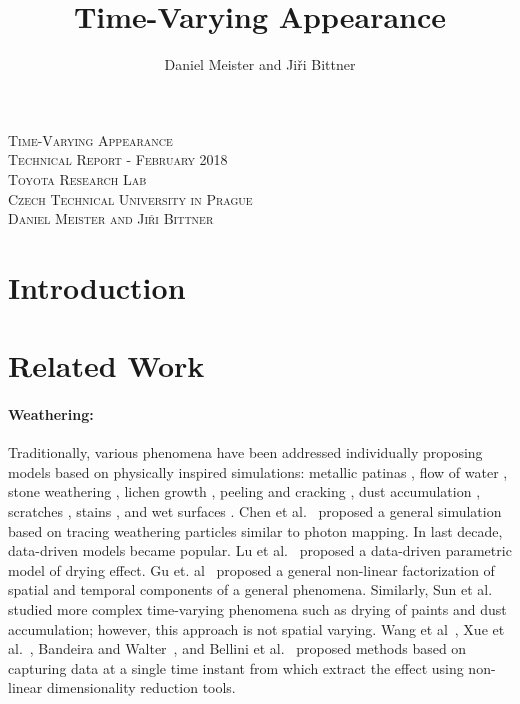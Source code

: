 \documentclass[11pt]{article}
\author{Daniel Meister and Ji\v{r}i Bittner}
\title{Time-Varying Appearance}
\begin{document}
\begin{center}
\textsc{\LARGE Time-Varying Appearance}\\[0.3cm]
\textsc{\Large Technical Report - February 2018}\\[0.3cm]
\textsc{\large Toyota Research Lab}\\[0.2cm]
\textsc{\large Czech Technical University in Prague}\\[0.2cm]
\textsc{\normalsize Daniel Meister and Ji\v{r}i Bittner}\\[0.5cm]
\end{center}

\section{Introduction}

\section{Related Work}

\paragraph{Weathering:} Traditionally, various phenomena have been addressed individually proposing models based on physically inspired simulations: metallic patinas \cite{Dorsey1996a}, flow of water \cite{Dorsey1996b}, stone weathering \cite{Dorsey1999,Xue2011}, lichen growth \cite{Desbenoit2004}, peeling and cracking \cite{Paquette2002}, dust accumulation \cite{Hsu1995}, scratches \cite{Bosch2004}, stains \cite{Bosch2011}, and wet surfaces \cite{Nakamae1990,Jensen1999}. Chen et al.~\cite{Chen2005} proposed a general simulation based on tracing weathering particles similar to photon mapping. In last decade, data-driven models became popular. Lu et al.~\cite{Lu2006} proposed a data-driven parametric model of drying effect. Gu et. al~\cite{Gu2006} proposed a general non-linear factorization of spatial and temporal components of a general phenomena. Similarly, Sun et al.~\cite{Sun2007} studied more complex time-varying phenomena such as drying of paints and dust accumulation; however, this approach is not spatial varying. Wang et al~\cite{Wang2006}, Xue et al.~\cite{Xue2008}, Bandeira and Walter~\cite{Bandeira2009}, and Bellini et al.~\cite{Bellini2016} proposed methods based on capturing data at a single time instant from which extract the effect using non-linear dimensionality reduction tools.

\end{document}
